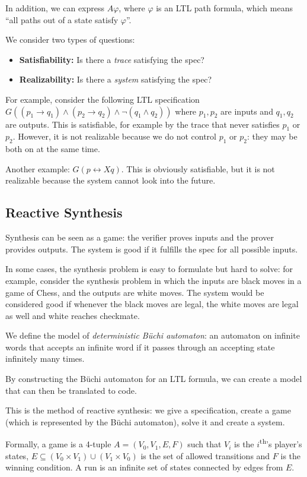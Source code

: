 In addition, we can express $A\varphi$, where $\varphi$ is an LTL path formula, which means 
``all paths out of a state satisfy $\varphi$''.

We consider two types of questions:
\begin{itemize}
\item \textbf{Satisfiability:} Is there a \emph{trace} satisfying the spec?
\item \textbf{Realizability:} Is there a \emph{system} satisfying the spec?
\end{itemize}

For example, consider the following LTL specification $G ((p_1 \to q_1) \wedge (p_2 \to q_2) \wedge \neg (q_1 \wedge q_2))$
where $p_1, p_2$ are inputs and $q_1, q_2$ are outputs.
This is satisfiable, for example by the trace that never satisfies $p_1$ or $p_2$.
However, it is not realizable because we do not control $p_1$ or $p_2$: they may
be both on at the same time.

Another example: $G (p \leftrightarrow Xq)$. This is obviously satisfiable, but it 
is not realizable because the system cannot look into the future.

\subsection{Reactive Synthesis}
Synthesis can be seen as a game: the verifier proves inputs and the prover provides outputs.
The system is good if it fulfills the spec for all possible inputs.

In some cases, the synthesis problem is easy to formulate but hard to solve:
for example, consider the synthesis problem in which the inputs are
black moves in a game of Chess, and the outputs are white moves. The
system would be considered good if whenever the black moves
are legal, the white moves are legal as well and white reaches
checkmate.

We define the model of \emph{deterministic B\"uchi automaton}: 
an automaton on infinite words that accepts an infinite word
if it passes through an accepting state infinitely many times.

By constructing the B\"uchi automaton for an LTL formula,
we can create a model that can then be translated to code.

This is the method of reactive synthesis: we give a specification,
create a game (which is represented by the B\"uchi automaton), 
solve it and create a system.

Formally, a game is a 4-tuple $A = (V_0, V_1, E, F)$ such that $V_i$ is the $i$\textsuperscript{th}'s player's states,
$E \subseteq (V_0 \times V_1) \cup (V_1 \times V_0)$ is the set of allowed transitions and $F$ is the 
winning condition. A run is an infinite set of states
connected by edges from $E$.

